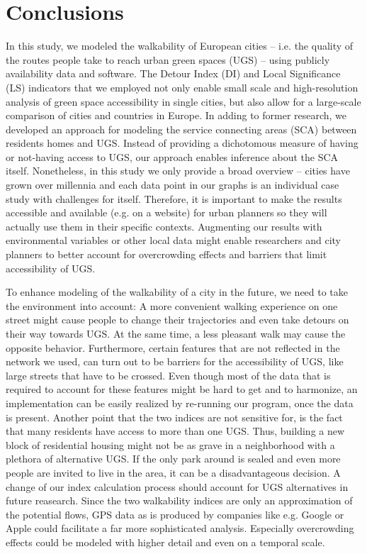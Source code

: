 \documentclass[10pt]{article}
\begin{document}
\section{Conclusions}
In this study, we modeled the walkability of European cities – i.e. the quality of the routes people take to reach urban green spaces (UGS) – using publicly availability data and software. 
The Detour Index (DI) and Local Significance (LS) indicators that we employed not only enable small scale and high-resolution analysis of green space accessibility in single cities, but also allow for a large-scale comparison of cities and countries in Europe.
In adding to former research, we developed an approach for modeling the service connecting areas (SCA) between residents homes and UGS.
Instead of providing a dichotomous measure of having or not-having access to UGS, our approach enables inference about the SCA itself.
Nonetheless, in this study we only provide a broad overview – cities have grown over millennia and each data point in our graphs is an individual case study with challenges for itself. 
Therefore, it is important to make the results accessible and available (e.g. on a website) for urban planners so they will actually use them in their specific contexts.
Augmenting our results with environmental variables or other local data might enable researchers and city planners to better account for overcrowding effects and barriers that limit accessibility of UGS.

To enhance modeling of the walkability of a city in the future, we need to take the environment into account:
A more convenient walking experience on one street might cause people to change their trajectories and even take detours on their way towards UGS.
At the same time, a less pleasant walk may cause the opposite behavior.
Furthermore, certain features that are not reflected in the network we used, can turn out to be barriers for the accessibility of UGS, like large streets that have to be crossed.
Even though most of the data that is required to account for these features might be hard to get and to harmonize, an implementation can be easily realized by re-running our program, once the data is present.
Another point that the two indices are not sensitive for, is the fact that many residents have access to more than one UGS. 
Thus, building a new block of residential housing might not be as grave in a neighborhood with a plethora of alternative UGS. If the only park around is sealed and even more people are invited to live in the area, it can be a disadvantageous decision. 
A change of our index calculation process should account for UGS alternatives in future reasearch.
Since the two walkability indices are only an approximation of the potential flows, GPS data as is produced by companies like e.g. Google or Apple could facilitate a far more sophisticated analysis.
Especially overcrowding effects could be modeled with higher detail and even on a temporal scale. 


%
\end{document}
